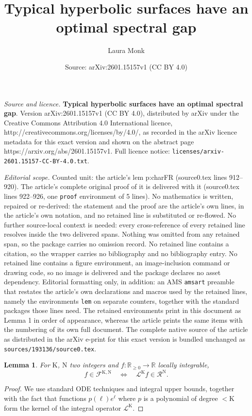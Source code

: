 \documentclass[10pt,a4paper]{amsart}
\title{\textbf{Typical hyperbolic surfaces have an optimal spectral gap}}
\author{Laura Monk}
\date{Source: arXiv:2601.15157v1 (CC BY 4.0)}
\newtheorem{lem}{Lemma}
\newcommand{\R}{\mathbb{R}}
\newcommand{\cF}{\mathcal{F}}
\newcommand{\cL}{\mathcal{L}}
\newcommand{\cR}{\mathcal{R}}
\newcommand{\rK}{\mathrm{K}}
\newcommand{\rN}{\mathrm{N}}
\begin{document}
\maketitle

\noindent\emph{Source and licence.} \textbf{Typical hyperbolic surfaces have an optimal spectral gap}. Version arXiv:2601.15157v1 (CC BY 4.0), distributed by arXiv under the Creative Commons Attribution 4.0 International licence, http://creativecommons.org/licenses/by/4.0/, as recorded in the arXiv licence metadata for this exact version and shown on the abstract page https://arxiv.org/abs/2601.15157v1. Full licence notice: \texttt{licenses/arxiv-2601.15157-CC-BY-4.0.txt}.\par\smallskip

\noindent\textit{Editorial scope.} Counted unit: the article's lem p:charFR (source0.tex lines 912--920). The article's complete original proof of it is delivered with it (source0.tex lines 922--926, one \texttt{proof} environment of 5 lines). No mathematics is written, repaired or re-derived: the statement and the proof are the article's own lines, in the article's own notation, and no retained line is substituted or re-flowed.  No further source-local context is needed: every cross-reference of every retained line resolves inside the two delivered spans.  Nothing was omitted from any retained span, so the package carries no omission record.  No retained line contains a citation, so the wrapper carries no bibliography and no bibliography entry.  No retained line contains a figure environment, an image-inclusion command or drawing code, so no image is delivered and the package declares no asset dependency.  Editorial formatting only, in addition: an AMS \texttt{amsart} preamble that restates the article's own declarations and macros used by the retained lines, namely the environments \texttt{lem} on separate counters, together with the standard packages those lines need.  The retained environments print in this document as Lemma 1 in order of appearance, whereas the article prints the same items with the numbering of its own full document.  The complete native source of the article as distributed in the arXiv e-print for this exact version is bundled unchanged as \texttt{sources/193136/source0.tex}.
\begin{lem}\label{p:charFR} For $\rK$, $\rN$ two integers and $f : \R_{\geq 0} \rightarrow \R$
  locally integrable,
  \begin{equation*}
    f\in \cF^{\rK,\rN}
    \quad \Leftrightarrow \quad
    \cL^{\rK} f\in \cR^{\rN}.
    \end{equation*}
  \end{lem}

  \begin{proof}
    We use standard ODE techniques and integral upper bounds, together with the fact that functions
    $p(\ell)e^\ell$ where $p$ is a polynomial of degree $< \rK$ form the kernel of the integral
    operator $\cL^{\rK}$.
  \end{proof}
\end{document}
